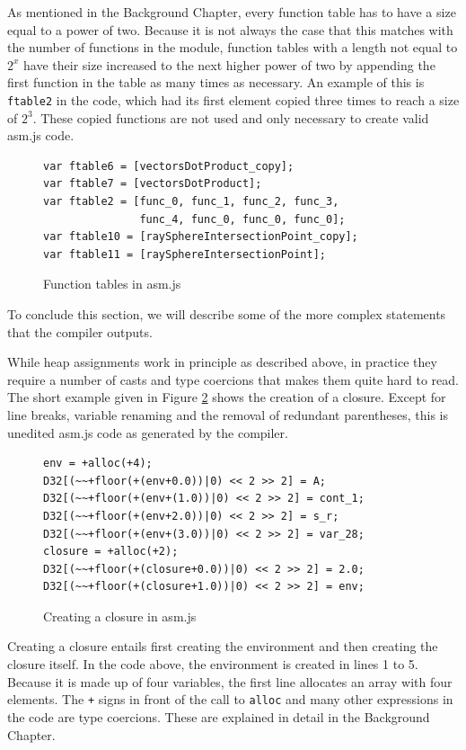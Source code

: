 \documentclass[11pt]{report}
\begin{document}
As mentioned in the Background Chapter, every function table has to have a size equal to a power of two. Because it is not always the case that this matches with the number of functions in the module, function tables with a length not equal to $2^x$ have their size increased to the next higher power of two by appending the first function in the table as many times as necessary. An example of this is \texttt{ftable2} in the code, which had its first element copied three times to reach a size of $2^3$. These copied functions are not used and only necessary to create valid asm.js code.

\begin{figure}[t]
\begin{lstlisting}
var ftable6 = [vectorsDotProduct_copy];
var ftable7 = [vectorsDotProduct];
var ftable2 = [func_0, func_1, func_2, func_3, 
               func_4, func_0, func_0, func_0];
var ftable10 = [raySphereIntersectionPoint_copy];
var ftable11 = [raySphereIntersectionPoint];
\end{lstlisting}
\caption{Function tables in asm.js}
\label{iasmjsmm6}
\end{figure}

To conclude this section, we will describe some of the more complex statements that the compiler outputs.

While heap assignments work in principle as described above, in practice they require a number of casts and type coercions that makes them quite hard to read. The short example given in Figure \ref{iasmjsmm7} shows the creation of a closure. Except for line breaks, variable renaming and the removal of redundant parentheses, this is unedited asm.js code as generated by the compiler.

\begin{figure}[ht]
\begin{lstlisting}
env = +alloc(+4);
D32[(~~+floor(+(env+0.0))|0) << 2 >> 2] = A;
D32[(~~+floor(+(env+(1.0))|0) << 2 >> 2] = cont_1;
D32[(~~+floor(+(env+2.0))|0) << 2 >> 2] = s_r;
D32[(~~+floor(+(env+(3.0))|0) << 2 >> 2] = var_28;
closure = +alloc(+2);
D32[(~~+floor(+(closure+0.0))|0) << 2 >> 2] = 2.0;
D32[(~~+floor(+(closure+1.0))|0) << 2 >> 2] = env;
\end{lstlisting}
\caption{Creating a closure in asm.js}
\label{iasmjsmm7}
\end{figure}

Creating a closure entails first creating the environment and then creating the closure itself. In the code above, the environment is created in lines 1 to 5. Because it is made up of four variables, the first line allocates an array with four elements. The \texttt{+} signs in front of the call to \texttt{alloc} and many other expressions in the code are type coercions. These are explained in detail in the Background Chapter.
\end{document}
